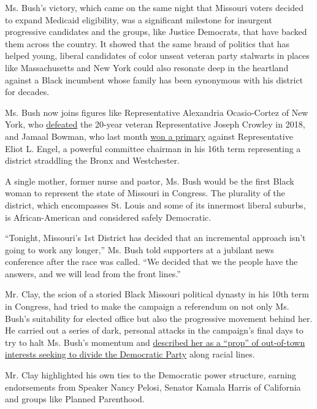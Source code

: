 Ms. Bush's victory, which came on the same night that Missouri voters
decided to expand Medicaid eligibility, was a significant milestone for
insurgent progressive candidates and the groups, like Justice Democrats,
that have backed them across the country. It showed that the same brand
of politics that has helped young, liberal candidates of color unseat
veteran party stalwarts in places like Massachusetts and New York could
also resonate deep in the heartland against a Black incumbent whose
family has been synonymous with his district for decades.

Ms. Bush now joins figures like Representative Alexandria Ocasio-Cortez
of New York, who
\href{https://www.nytimes3xbfgragh.onion/2018/06/26/nyregion/joseph-crowley-ocasio-cortez-democratic-primary.html}{defeated}
the 20-year veteran Representative Joseph Crowley in 2018, and Jamaal
Bowman, who last month
\href{https://www.nytimes3xbfgragh.onion/2020/07/17/nyregion/jamaal-bowman-eliot-engel.html}{won
a primary} against Representative Eliot L. Engel, a powerful committee
chairman in his 16th term representing a district straddling the Bronx
and Westchester.

A single mother, former nurse and pastor, Ms. Bush would be the first
Black woman to represent the state of Missouri in Congress. The
plurality of the district, which encompasses St. Louis and some of its
innermost liberal suburbs, is African-American and considered safely
Democratic.

``Tonight, Missouri's 1st District has decided that an incremental
approach isn't going to work any longer,'' Ms. Bush told supporters at a
jubilant news conference after the race was called. ``We decided that we
the people have the answers, and we will lead from the front lines.''

Mr. Clay, the scion of a storied Black Missouri political dynasty in his
10th term in Congress, had tried to make the campaign a referendum on
not only Ms. Bush's suitability for elected office but also the
progressive movement behind her. He carried out a series of dark,
personal attacks in the campaign's final days to try to halt Ms. Bush's
momentum and
\href{https://www.nytimes3xbfgragh.onion/2020/08/02/us/politics/cori-bush-william-lacy-clay-missouri.html}{described
her as a ``prop'' of out-of-town interests seeking to divide the
Democratic Party} along racial lines.

Mr. Clay highlighted his own ties to the Democratic power structure,
earning endorsements from Speaker Nancy Pelosi, Senator Kamala Harris of
California and groups like Planned Parenthood.

